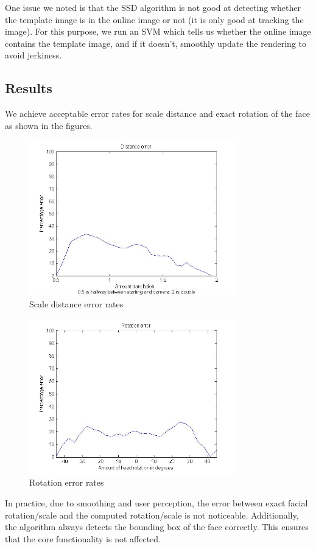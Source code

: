 \documentclass[10pt,twocolumn,letterpaper]{article}
\begin{document}
One issue we noted is that the SSD algorithm is not good at detecting whether the template
image is in the online image or not (it is only good at tracking the image). For this
purpose, we run an SVM which tells us whether the online image contains the template image,
and if it doesn't, smoothly update the rendering to avoid jerkiness.

\subsection*{Results}
We achieve acceptable error rates for scale distance and exact rotation of the face as shown in the figures.
\begin{figure}[ht!]
\centering
\includegraphics[width=90mm]{distance_error.jpg}
\caption{Scale distance error rates\label{overflow}}
\end{figure}
\begin{figure}[ht!]
\centering
\includegraphics[width=90mm]{rotation_error.jpg}
\caption{Rotation error rates \label{overflow}}
\end{figure}
In practice, due to smoothing and user perception, the error between exact facial rotation/scale and the computed rotation/scale is not noticeable. Additionally, the algorithm always detects the bounding box of the face correctly. This ensures that the core functionality is not affected.
\end{document}
